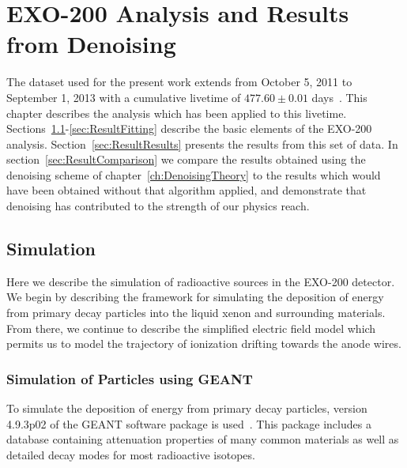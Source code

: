 \renewcommand{\thechapter}{7}
\chapter{EXO-200 Analysis and Results from Denoising}
\label{ch:DenoisingResults}

The dataset used for the present work extends from October 5, 2011 to September 1, 2013 with a cumulative livetime of $477.60 \pm 0.01$ days~\cite{NewEXObb0nPaper_2014}.  This chapter describes the analysis which has been applied to this livetime.  Sections~\ref{sec:ResultSimulation}-\ref{sec:ResultFitting} describe the basic elements of the EXO-200 analysis.  Section~\ref{sec:ResultResults} presents the results from this set of data.  In section~\ref{sec:ResultComparison} we compare the results obtained using the denoising scheme of chapter~\ref{ch:DenoisingTheory} to the results which would have been obtained without that algorithm applied, and demonstrate that denoising has contributed to the strength of our physics reach.

\section{Simulation}\label{sec:ResultSimulation}

Here we describe the simulation of radioactive sources in the EXO-200 detector.  We begin by describing the framework for simulating the deposition of energy from primary decay particles into the liquid xenon and surrounding materials.  From there, we continue to describe the simplified electric field model which permits us to model the trajectory of ionization drifting towards the anode wires.

\subsection{Simulation of Particles using GEANT}

To simulate the deposition of energy from primary decay particles, version 4.9.3p02 of the GEANT software package is used~\cite{Agostinelli2003250,1610988}.  This package includes a database containing attenuation properties of many common materials as well as detailed decay modes for most radioactive isotopes.

